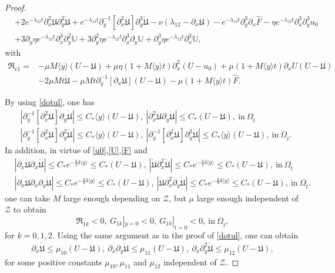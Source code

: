 \documentclass{amsart}
\numberwithin{equation}{section}
\newcommand\y{{{\langle y \rangle}}}
\begin{document}
\begin{proof}
\begin{align*}
 &+2e^{-\lambda_{12}t}\partial_{x}^{2}\mathfrak{U}\partial_{y}^{2}\dot{\mathfrak{U}}
  +e^{-\lambda_{12}t}\partial_{y}^{-1}[\partial_{x}^{2}\mathfrak{U}]\partial_{y}^{3}\dot{\mathfrak{U}}
  -\nu(\lambda_{12}-\partial_{x}\mathfrak{U})
  -e^{-\lambda_{12}t}\partial_{y}^{3}\partial_{x}\hat{F}
  -\eta e^{-\lambda_{12}t}\partial_{x}^{3}\partial_{y}^{3}u_{0}\\
 &+3\partial_{y}\eta e^{-\lambda_{12}t}\partial_{x}^{3}\partial_{y}^{2}\mathbb{U}
  +3\partial_{y}^{2}\eta e^{-\lambda_{12}t}\partial_{x}^{3}\partial_{y}\mathbb{U}
  +\partial_{y}^{3}\eta e^{-\lambda_{12}t}\partial_{x}^{3}\mathbb{U},
\end{align*}
with
\begin{align*}
\mathfrak{R}_{c1}
=&-\mu M\y(U-\mathfrak{U})
  +\mu\eta(1+M\y t)\partial_{x}^{2}(U-u_{0})
  +\mu(1+M\y t)\partial_{x}U(U-\mathfrak{U})\\
 &-2\mu Mt\dot{\mathfrak{U}}
  -\mu Mt\partial_{y}^{-1}[\partial_{x}\mathfrak{U}](U-\mathfrak{U})
  -\mu(1+M\y t)\hat{F}.
\end{align*}

By using \eqref{dotul}, one has
\begin{align*}
&|\partial_{y}^{-1}[\partial_{x}^{2}\mathfrak{U}]\partial_{y}\dot{\mathfrak{U}}|\leq C_{*}\y(U-\mathfrak{U}),~
 |\partial_{x}^{2}\mathfrak{U}\partial_{y}\dot{\mathfrak{U}}|\leq C_{*}(U-\mathfrak{U}),~\text{in}~\Omega_{\hat{t}}\\
&|\partial_{y}^{-1}[\partial_{x}^{2}\mathfrak{U}]\partial_{y}^{2}\dot{\mathfrak{U}}|\leq C_{*}\y(U-\mathfrak{U}),~
 |\partial_{y}^{-1}[\partial_{x}^{2}\mathfrak{U}]\partial_{y}^{3}\dot{\mathfrak{U}}|\leq C_{*}\y(U-\mathfrak{U}),~\text{in}~\Omega_{\hat{t}}.
\end{align*}
In addition, in virtue of  \eqref{u0},\eqref{U},\eqref{F} and
\begin{align*}
&|\partial_{x}\dot{\mathfrak{U}}\partial_{x}\dot{\mathfrak{U}}|\leq C_{*}e^{-\frac{4}{3}\delta\y}\leq C_{*}(U-\mathfrak{U}),~
 |\dot{\mathfrak{U}}\partial_{x}^{2}\dot{\mathfrak{U}}|\leq C_{*}e^{-\frac{4}{3}\delta\y}\leq C_{*}(U-\mathfrak{U}), ~\text{in}~\Omega_{\hat{t}}\\
&|\partial_{x}\dot{\mathfrak{U}}\partial_{x}\partial_{y}\dot{\mathfrak{U}}|\leq C_{*}e^{-\frac{4}{3}\delta\y}\leq C_{*}(U-\mathfrak{U}),~
 |\dot{\mathfrak{U}}\partial_{x}^{2}\partial_{y}\dot{\mathfrak{U}}|
 \leq C_{*}e^{-\frac{4}{3}\delta\y}\leq C_{*}(U-\mathfrak{U}),~\text{in}~\Omega_{\hat{t}}.
\end{align*}
one can take $M$ large enough depending on $\mathcal{Z}$, but $\mu$ large enough independent of $\mathcal{Z}$ to obtain
$$\mathfrak{R}_{1k}<0,~G_{1k}|_{y=0}<0,~G_{1k}|_{t=0}<0,~\text{in}~\Omega_{\hat{t}},$$
for $k=0,1,2$. Using the same argument as in the proof of \eqref{dotul}, one can obtain
\begin{align*}
\partial_{x}\dot{\mathfrak{U}}\leq \mu_{10}(U-\mathfrak{U}),~
\partial_{x}\partial_{y}\dot{\mathfrak{U}}\leq \mu_{11}(U-\mathfrak{U}),~
\partial_{x}\partial_{y}^{2}\dot{\mathfrak{U}}\leq \mu_{12}(U-\mathfrak{U}),
\end{align*}
for some positive constants $\mu_{10},\mu_{11}$ and $\mu_{12}$ independent of $\mathcal{Z}$.


\end{proof}
\end{document}
